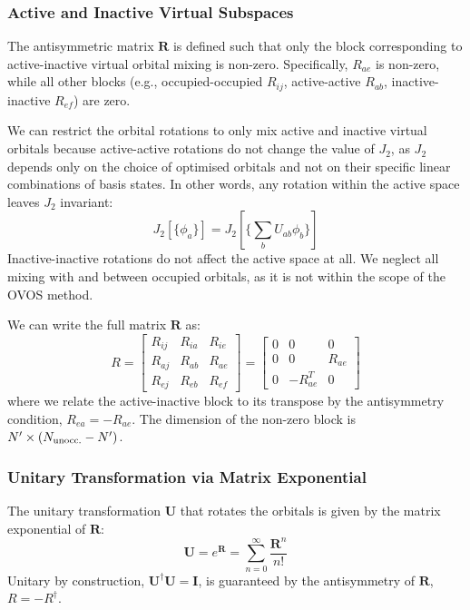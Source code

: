\subsubsection{Active and Inactive Virtual Subspaces}

The antisymmetric matrix $\mathbf{R}$ is defined such that only the block corresponding to active-inactive virtual orbital mixing is non-zero. Specifically, $R_{ae}$ is non-zero, while all other blocks (e.g., occupied-occupied $R_{ij}$, active-active $R_{ab}$, inactive-inactive $R_{ef}$) are zero.

We can restrict the orbital rotations to only mix active and inactive virtual orbitals because active-active rotations do not change the value of $J_2$, as $J_2$ depends only on the choice of optimised orbitals and not on their specific linear combinations of basis states. In other words, any rotation within the active space leaves $J_2$ invariant:
\begin{equation}
    J_2[\{\phi_a\}] = J_2[\{\sum_b U_{ab}\phi_b\}]
\end{equation}
Inactive-inactive rotations do not affect the active space at all. We neglect all mixing with and between occupied orbitals, as it is not within the scope of the OVOS method.

We can write the full matrix $\mathbf{R}$ as:
\begin{equation}
    R = 
    \begin{bmatrix}
        R_{ij} & R_{ia} & R_{ie} \\
        R_{aj} & R_{ab} & R_{ae} \\
        R_{ej} & R_{eb} & R_{ef}
    \end{bmatrix}
    = 
    \begin{bmatrix}
        0 & 0 & 0 \\
        0 & 0 & R_{ae} \\
        0 & -R_{ae}^T & 0
    \end{bmatrix}
\end{equation}
where we relate the active-inactive block to its transpose by the antisymmetry condition, $R_{ea} = -R_{ae}$. The dimension of the non-zero block is $N' \times (N_{\rm unocc.} - N')$.

\subsubsection{Unitary Transformation via Matrix Exponential}

The unitary transformation $\mathbf{U}$ that rotates the orbitals is given by the matrix exponential of $\mathbf{R}$:
\begin{equation}
    \mathbf{U} = e^{\mathbf{R}} = \sum_{n=0}^{\infty} \frac{\mathbf{R}^n}{n!}
\end{equation}
Unitary by construction, $\mathbf{U}^\dagger \mathbf{U} = \mathbf{I}$, is guaranteed by the antisymmetry of $\mathbf{R}$, $R = -R^\dagger$. 

